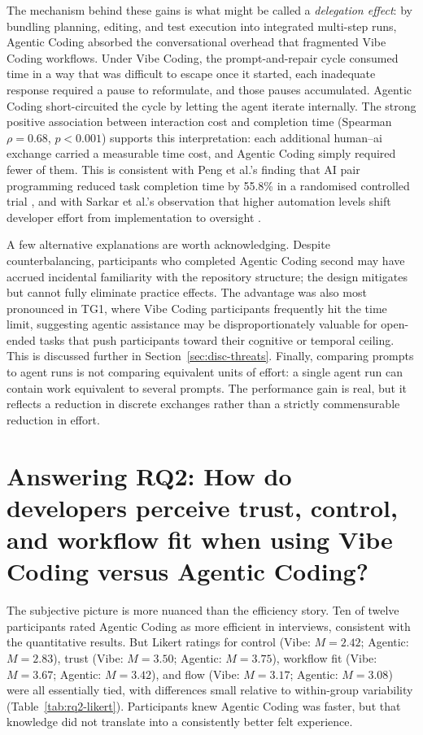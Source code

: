 The mechanism behind these gains is what might be called a \emph{delegation effect}: by bundling planning, editing, and test execution into integrated multi-step runs, Agentic Coding absorbed the conversational overhead that fragmented Vibe Coding workflows. Under Vibe Coding, the prompt-and-repair cycle consumed time in a way that was difficult to escape once it started, each inadequate response required a pause to reformulate, and those pauses accumulated. Agentic Coding short-circuited the cycle by letting the agent iterate internally. The strong positive association between interaction cost and completion time (Spearman $\rho=0.68$, $p<0.001$) supports this interpretation: each additional human--\gls{ai} exchange carried a measurable time cost, and Agentic Coding simply required fewer of them. This is consistent with Peng et al.'s finding that AI pair programming reduced task completion time by 55.8\% in a randomised controlled trial \parencite{peng2023copilot}, and with Sarkar et al.'s observation that higher automation levels shift developer effort from implementation to oversight \parencite{sarkar2025codewithme}.

A few alternative explanations are worth acknowledging. Despite counterbalancing, participants who completed Agentic Coding second may have accrued incidental familiarity with the repository structure; the design mitigates but cannot fully eliminate practice effects. The advantage was also most pronounced in TG1, where Vibe Coding participants frequently hit the time limit, suggesting agentic assistance may be disproportionately valuable for open-ended tasks that push participants toward their cognitive or temporal ceiling. This is discussed further in Section~\ref{sec:disc-threats}. Finally, comparing prompts to agent runs is not comparing equivalent units of effort: a single agent run can contain work equivalent to several prompts. The performance gain is real, but it reflects a reduction in discrete exchanges rather than a strictly commensurable reduction in effort.


\section{Answering RQ2: How do developers perceive trust, control, and workflow fit when using Vibe Coding versus Agentic Coding?}

\label{sec:disc-rq2}

The subjective picture is more nuanced than the efficiency story. Ten of twelve participants rated Agentic Coding as more efficient in interviews, consistent with the quantitative results. But Likert ratings for control (Vibe: $M=2.42$; Agentic: $M=2.83$), trust (Vibe: $M=3.50$; Agentic: $M=3.75$), workflow fit (Vibe: $M=3.67$; Agentic: $M=3.42$), and flow (Vibe: $M=3.17$; Agentic: $M=3.08$) were all essentially tied, with differences small relative to within-group variability (Table~\ref{tab:rq2-likert}). Participants knew Agentic Coding was faster, but that knowledge did not translate into a consistently better felt experience.

